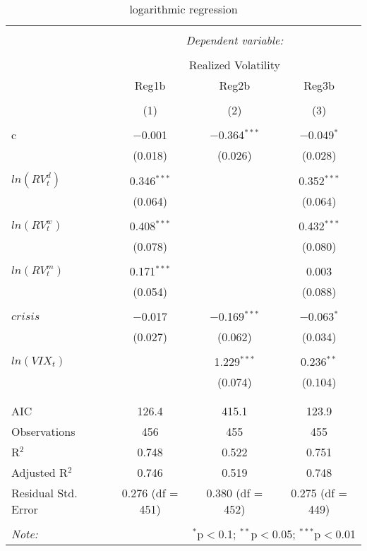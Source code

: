 
\begin{table}[!htbp] \centering 
  \caption{logarithmic regression} 
  \label{} 
\begin{tabular}{@{\extracolsep{5pt}}lccc} 
\\[-1.8ex]\hline 
\hline \\[-1.8ex] 
 & \multicolumn{3}{c}{\textit{Dependent variable:}} \\ 
\cline{2-4} 
\\[-1.8ex] & \multicolumn{3}{c}{Realized Volatility} \\ 
 & Reg1b & Reg2b & Reg3b \\ 
\\[-1.8ex] & (1) & (2) & (3)\\ 
\hline \\[-1.8ex] 
 c & $-$0.001 & $-$0.364$^{***}$ & $-$0.049$^{*}$ \\ 
  & (0.018) & (0.026) & (0.028) \\ 
  & & & \\ 
 $ ln(RV^{d}_{t})$ & 0.346$^{***}$ &  & 0.352$^{***}$ \\ 
  & (0.064) &  & (0.064) \\ 
  & & & \\ 
 $ln(RV^{w}_{t})$ & 0.408$^{***}$ &  & 0.432$^{***}$ \\ 
  & (0.078) &  & (0.080) \\ 
  & & & \\ 
 $ ln(RV^{m}_{t})$ & 0.171$^{***}$ &  & 0.003 \\ 
  & (0.054) &  & (0.088) \\ 
  & & & \\ 
 $crisis$ & $-$0.017 & $-$0.169$^{***}$ & $-$0.063$^{*}$ \\ 
  & (0.027) & (0.062) & (0.034) \\ 
  & & & \\ 
 $ln(VIX_{t})$ &  & 1.229$^{***}$ & 0.236$^{**}$ \\ 
  &  & (0.074) & (0.104) \\ 
  & & & \\ 
\hline \\[-1.8ex] 
AIC & 126.4 & 415.1 & 123.9 \\ 
Observations & 456 & 455 & 455 \\ 
R$^{2}$ & 0.748 & 0.522 & 0.751 \\ 
Adjusted R$^{2}$ & 0.746 & 0.519 & 0.748 \\ 
Residual Std. Error & 0.276 (df = 451) & 0.380 (df = 452) & 0.275 (df = 449) \\ 
\hline 
\hline \\[-1.8ex] 
\textit{Note:}  & \multicolumn{3}{r}{$^{*}$p$<$0.1; $^{**}$p$<$0.05; $^{***}$p$<$0.01} \\ 
\end{tabular} 
\end{table} 
